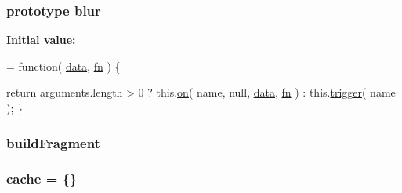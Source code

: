 \subsubsection[{blur}]{ {\bf prototype} blur}\label{jquery-1_810_82-vsdoc_8js_a13e7c39ee7152118878db346f297e09c}
{\bfseries Initial value\+:}
\begin{DoxyCode}
= \textcolor{keyword}{function}( \hyperlink{jquery-1_810_82-vsdoc_8js_a609407b3456fdc3c5671a9fc4a226ff7}{data}, \hyperlink{jquery-1_810_82-vsdoc_8js_acef6bdaf6b9b20fdcca1ea86f0902c3b}{fn} ) \{


        \textcolor{keywordflow}{return} arguments.length > 0 ?
            this.\hyperlink{jquery-1_810_82-vsdoc_8js_ae453b412b883f60220d73468ef6c6dbc}{on}( name, null, \hyperlink{jquery-1_810_82-vsdoc_8js_a609407b3456fdc3c5671a9fc4a226ff7}{data}, \hyperlink{jquery-1_810_82-vsdoc_8js_acef6bdaf6b9b20fdcca1ea86f0902c3b}{fn} ) :
            this.\hyperlink{jquery-1_810_82-vsdoc_8js_a2388c4114d5e3e4eab020f973641519c}{trigger}( name );
    \}
\end{DoxyCode}
\hypertarget{jquery-1_810_82-vsdoc_8js_a7166c09152b93f5b7ecfea8e7a61ba8c}{}
\subsubsection[{build\+Fragment}]{ build\+Fragment}\label{jquery-1_810_82-vsdoc_8js_a7166c09152b93f5b7ecfea8e7a61ba8c}
\hypertarget{jquery-1_810_82-vsdoc_8js_acdb445beb9aa4c6dbdf28258e18dbb58}{}
\subsubsection[{cache}]{ cache = \{\}}\label{jquery-1_810_82-vsdoc_8js_acdb445beb9aa4c6dbdf28258e18dbb58}
\hypertarget{jquery-1_810_82-vsdoc_8js_add8d59d25831bb9b171fdbee8a18795b}{}
